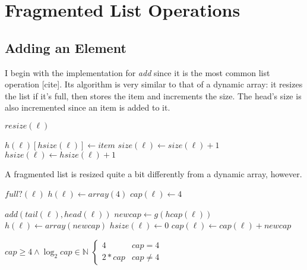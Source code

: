 \documentclass{article}
\begin{document}
	\section{Fragmented List Operations}
	\label{Fragmented List Operations}
	
	\subsection{Adding an Element}
	
	I begin with the implementation for \textit{add} since it is the most common list operation [cite]. Its algorithm is very similar to that of a dynamic array: it resizes the list if it's full, then stores the item and increments the size. The head's size is also incremented since an item is added to it.
	
	\begin{algorithm}\begin{algorithmic}[1]
					\State $resize(\ell)$
				\EndIf
				
				\State $h(\ell)[hsize(\ell)] \gets item$
				\State $size(\ell) \gets size(\ell) + 1$
				\State $hsize(\ell) \gets hsize(\ell) + 1$
			\EndProcedure
		\end{algorithmic}\end{algorithm}
	
	A fragmented list is resized quite a bit differently from a dynamic array, however. %
	
	\begin{algorithm}\begin{algorithmic}[1]
				\Require
					\Statex $full?(\ell)$
					\State $h(\ell) \gets array(4)$
					\State $cap(\ell) \gets 4$
					\State \Return
				\EndIf
			
				\State $add(tail(\ell), head(\ell))$
				\State $newcap \gets g(hcap(\ell))$
				\State $h(\ell) \gets array(newcap)$
				\State $hsize(\ell) \gets 0$
				\State $cap(\ell) \gets cap(\ell) + newcap$
			\EndProcedure
		\end{algorithmic}\end{algorithm}
	
	\begin{algorithm}\begin{algorithmic}[1]
			\Require
			\Statex $cap \geq 4 \land \log_2{cap} \in \mathbb{N}$
			\State \Return $\begin{cases}
			4 & cap = 4\\
			2 * cap & cap \neq 4
			\end{cases}$
			\EndFunction
		\end{algorithmic}\end{algorithm}
	
\end{document}

